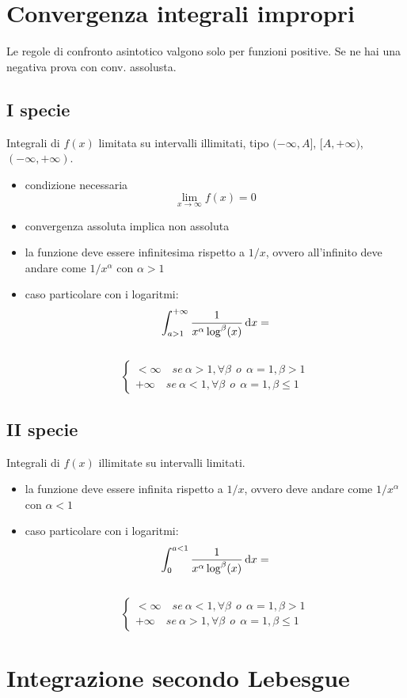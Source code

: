 \documentclass[a4paper,portrait,columns=3,5pt]{cheatsheet}
\begin{document}
\section{Convergenza integrali impropri}
Le regole di confronto asintotico valgono solo per funzioni positive. Se ne hai una negativa prova con conv. assolusta.
\subsection{I specie}
Integrali di $f(x)$ limitata su intervalli illimitati, tipo $(- \infty, A]$, $[A, + \infty)$, $(-\infty, + \infty)$.
\begin{itemize}
    \item condizione necessaria $$\lim_ {x \rightarrow \infty} f(x) = 0$$
    \item convergenza assoluta implica non assoluta
    \item la funzione deve essere infinitesima rispetto a $1/x$, ovvero  all'infinito deve andare come $1/x^{\alpha}$ con $\alpha > 1$
    \item caso particolare con i logaritmi: $$ \int_{a>1}^{+ \infty} \frac{1}{x^\alpha \log^\beta (x)} \dif x  =$$ \\$$
    \begin{cases*}
        < \infty \quad se~\alpha > 1, \forall \beta ~~ o ~~ \alpha = 1, \beta > 1 \\
        + \infty \quad se~\alpha < 1, \forall \beta ~~ o ~~ \alpha = 1, \beta \leq 1
    \end{cases*}$$
\end{itemize}
\subsection{II specie}
Integrali di $f(x)$ illimitate su intervalli limitati. 
\begin{itemize}
    \item la funzione deve essere infinita rispetto a $1/x$, ovvero deve andare come $1/x^{\alpha}$ con $\alpha < 1$
    \item caso particolare con i logaritmi:
    $$ \int_0^{a<1} \frac{1}{x^\alpha \log^\beta (x)} \dif x  =$$ \\$$
    \begin{cases*}
        < \infty \quad se~\alpha < 1, \forall \beta ~~ o ~~ \alpha = 1, \beta > 1 \\
        + \infty \quad se~\alpha > 1, \forall \beta ~~ o ~~ \alpha = 1, \beta \leq 1
    \end{cases*}$$
\end{itemize}

\section{Integrazione secondo Lebesgue}
\end{document}
